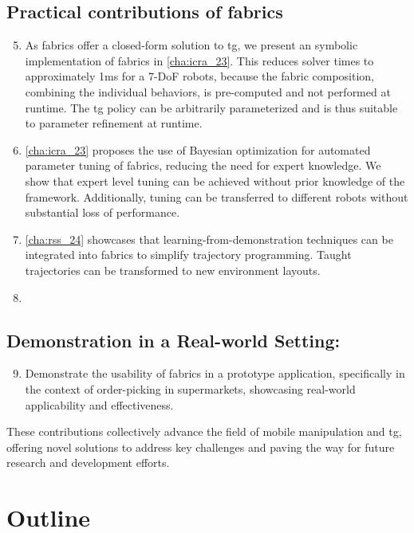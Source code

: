 \subsection{Practical contributions of \ac{fabrics}}
\begin{enumerate}
  \setcounter{enumi}{4}
  \item As \ac{fabrics} offer a closed-form solution to
    \ac{tg}, we present an symbolic implementation of
    \ac{fabrics} in \cref{cha:icra_23}. This reduces
    solver times to approximately 1ms for a 7-DoF robots, 
    because the fabric composition, combining
    the individual behaviors, is pre-computed and not
    performed at runtime. The \ac{tg} policy can be
    arbitrarily parameterized and is thus suitable to
    parameter refinement at runtime.
  \item \cref{cha:icra_23} proposes the use of Bayesian optimization for
    automated parameter tuning of \ac{fabrics},
    reducing the need for expert knowledge. We show that
    expert level tuning can be achieved without prior
    knowledge of the framework. Additionally, tuning can
    be transferred to different robots without substantial
    loss of performance.
  \item \cref{cha:rss_24} showcases that learning-from-demonstration
    techniques can be integrated into \ac{fabrics} to
    simplify trajectory programming. Taught trajectories
    can be transformed to new environment layouts. 
  \item {}
\end{enumerate}

\subsection{Demonstration in a Real-world Setting:}
\begin{enumerate}
    \setcounter{enumi}{8}
    \item Demonstrate the usability of \ac{fabrics}
      in a prototype application, specifically in the
      context of order-picking in supermarkets, showcasing
      real-world applicability and effectiveness.
\end{enumerate}

These contributions collectively advance the field of mobile
manipulation and \ac{tg}, offering novel
solutions to address key challenges and paving the way for
future research and development efforts.

\section{Outline}

